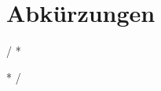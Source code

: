 \documentclass{IEEEtran}
\begin{document}
\section*{Abkürzungen}
\renewcommand{\IEEEiedlistdecl}{\IEEEsetlabelwidth{CSMA/CA}}
\begin{acronym}
\end{acronym}
\renewcommand{\IEEEiedlistdecl}{\relax}%

\comment / *
\listoffigures
\clearpage

\listoftables
\clearpage
* /




\end{document}
